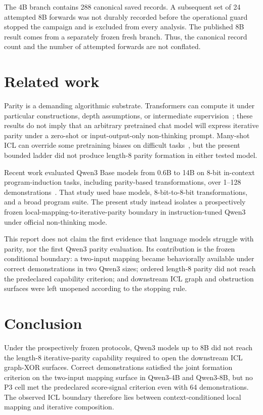 \documentclass[10pt,a4paper]{article}
\begin{document}
The 4B branch contains 288 canonical saved records. A subsequent set of 24 attempted 8B forwards was not durably recorded before the operational guard stopped the campaign and is excluded from every analysis. The published 8B result comes from a separately frozen fresh branch. Thus, the canonical record count and the number of attempted forwards are not conflated.

\section{Related work}

Parity is a demanding algorithmic substrate. Transformers can compute it under particular constructions, depth assumptions, or intermediate supervision~\cite{kim2025,kozachinskiy2026}; these results do not imply that an arbitrary pretrained chat model will express iterative parity under a zero-shot or input-output-only non-thinking prompt. Many-shot ICL can override some pretraining biases on difficult tasks~\cite{agarwal2024}, but the present bounded ladder did not produce length-8 parity formation in either tested model.

Recent work evaluated Qwen3 Base models from 0.6B to 14B on 8-bit in-context program-induction tasks, including parity-based transformations, over 1--128 demonstrations~\cite{breslow2025}. That study used base models, 8-bit-to-8-bit transformations, and a broad program suite. The present study instead isolates a prospectively frozen local-mapping-to-iterative-parity boundary in instruction-tuned Qwen3 under official non-thinking mode.

This report does not claim the first evidence that language models struggle with parity, nor the first Qwen3 parity evaluation. Its contribution is the frozen conditional boundary: a two-input mapping became behaviorally available under correct demonstrations in two Qwen3 sizes; ordered length-8 parity did not reach the predeclared capability criterion; and downstream ICL graph and obstruction surfaces were left unopened according to the stopping rule.

\section{Conclusion}

Under the prospectively frozen protocols, Qwen3 models up to 8B did not reach the length-8 iterative-parity capability required to open the downstream ICL graph-XOR surfaces. Correct demonstrations satisfied the joint formation criterion on the two-input mapping surface in Qwen3-4B and Qwen3-8B, but no P3 cell met the predeclared score-signal criterion even with 64 demonstrations. The observed ICL boundary therefore lies between context-conditioned local mapping and iterative composition.
\end{document}
